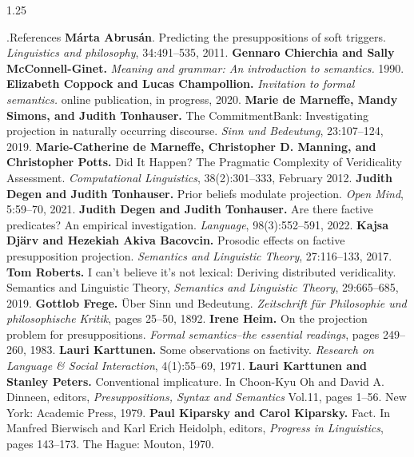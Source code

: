 \documentclass[final, table]{beamer}
\newlength{\colwidth}
\begin{document}
\begin{frame}[t]
\begin{columns}[t]
\begin{column}{1.25\colwidth}
\begin{normalbox}{\phantom.\hfill References}
				\textbf{Márta Abrusán}. Predicting the presuppositions of soft triggers. \textit{Linguistics and philosophy}, 34:491–535, 2011.\quad\textbullet\quad
				\textbf{Gennaro Chierchia and Sally McConnell-Ginet.} \textit{Meaning and grammar: An introduction to semantics.} 1990.\quad\textbullet\quad
				\textbf{Elizabeth Coppock and Lucas Champollion.} \textit{Invitation to formal semantics.} online publication, in progress, 2020.\quad\textbullet\quad
				\textbf{Marie de Marneffe, Mandy Simons, and Judith Tonhauser.} The CommitmentBank: Investigating projection in naturally occurring discourse. \textit{Sinn und Bedeutung}, 23:107–124, 2019.\quad\textbullet\quad
				\textbf{Marie-Catherine de Marneffe, Christopher D. Manning, and Christopher Potts.} Did It Happen? The Pragmatic Complexity of Veridicality Assessment. \textit{Computational Linguistics}, 38(2):301–333, February 2012.\quad\textbullet\quad
				\textbf{Judith Degen and Judith Tonhauser.} Prior beliefs modulate projection. \textit{Open Mind}, 5:59–70, 2021.\quad\textbullet\quad
				\textbf{Judith Degen and Judith Tonhauser.} Are there factive predicates? An empirical investigation. \textit{Language}, 98(3):552–591, 2022.\quad\textbullet\quad
				\textbf{Kajsa Djärv and Hezekiah Akiva Bacovcin.} Prosodic effects on factive presupposition projection. \textit{Semantics and Linguistic Theory}, 27:116–133, 2017.\quad\textbullet\quad
				\textbf{Tom Roberts.} I can’t believe it’s not lexical: Deriving distributed veridicality. Semantics and Linguistic Theory, \textit{Semantics and Linguistic Theory}, 29:665–685, 2019.\quad\textbullet\quad
				\textbf{Gottlob Frege.} Über Sinn und Bedeutung. \textit{Zeitschrift für Philosophie und philosophische Kritik}, pages 25–50, 1892.\quad\textbullet\quad
				\textbf{Irene Heim.} On the projection problem for presuppositions. \textit{Formal semantics–the essential readings}, pages 249–260, 1983.\quad\textbullet\quad
				\textbf{Lauri Karttunen.} Some observations on factivity. \textit{Research on Language \& Social Interaction}, 4(1):55–69, 1971.\quad\textbullet\quad
				\textbf{Lauri Karttunen and Stanley Peters.} Conventional implicature. In Choon-Kyu Oh and David A. Dinneen, editors, \textit{Presuppositions, Syntax and Semantics} Vol.11, pages 1–56. New York: Academic Press, 1979.\quad\textbullet\quad
				\textbf{Paul Kiparsky and Carol Kiparsky.} Fact. In Manfred Bierwisch and Karl Erich Heidolph, editors, \textit{Progress in Linguistics}, pages 143–173. The Hague: Mouton, 1970.\quad\textbullet\quad

\end{normalbox}
\end{column}
\end{columns}
\end{frame}
\end{document}
